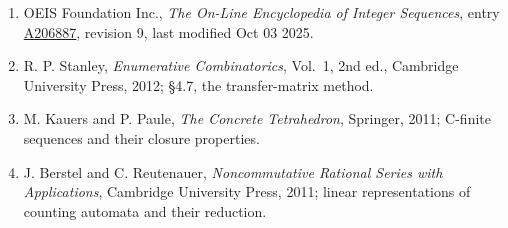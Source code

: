 \documentclass[11pt]{article}
\theoremstyle{definition}
\begin{document}
\begin{enumerate}

\item OEIS Foundation Inc., \emph{The On-Line Encyclopedia of Integer Sequences}, entry \href{https://oeis.org/A206887}{A206887}, revision 9, last modified Oct 03 2025.

\item R. P. Stanley, \emph{Enumerative Combinatorics}, Vol.~1, 2nd ed., Cambridge University Press, 2012; \S4.7, the transfer-matrix method.

\item M. Kauers and P. Paule, \emph{The Concrete Tetrahedron}, Springer, 2011; C-finite sequences and their closure properties.

\item J. Berstel and C. Reutenauer, \emph{Noncommutative Rational Series with Applications}, Cambridge University Press, 2011; linear representations of counting automata and their reduction.

\end{enumerate}
\end{document}
